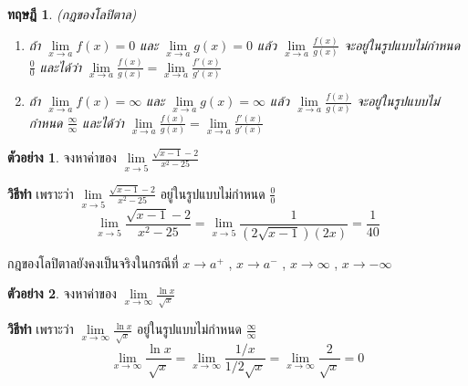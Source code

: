 \documentclass[
]{book}
\newtheorem{theorem}{ทฤษฎี}[chapter]
\theoremstyle{definition}
\theoremstyle{definition}
\newtheorem{example}{ตัวอย่าง}[chapter]
\theoremstyle{definition}
\theoremstyle{definition}
\theoremstyle{remark}
\begin{document}
\begin{theorem}

(กฎของโลปิตาล)\\

\begin{enumerate}
\def\labelenumi{\arabic{enumi}.}
\item
  ถ้า \(\mathop {\lim }\limits_{x\to a} f(x)=0\) และ \(\mathop {\lim
      }\limits_{x\to a} g(x)=0\) แล้ว
  \(\displaystyle \mathop {\lim }\limits_{x\to
      a}
      \frac{f(x)}{g(x)}\) จะอยู่ในรูปแบบไม่กำหนด
  \(\displaystyle \frac{0}{0}\) และได้ว่า
  \(\displaystyle \mathop {\lim }\limits_{x\to a}
      \frac{f(x)}{g(x)}=\mathop {\lim
      }\limits_{x\to a} \frac{{f}'(x)}{{g}'(x)}\)\\
\item
  ถ้า \(\mathop {\lim }\limits_{x\to a} f(x)=\infty\) และ \(\mathop {\lim
      }\limits_{x\to a} g(x)=\infty\) แล้ว \(\displaystyle \mathop {\lim
      }\limits_{x\to a}
      \frac{f(x)}{g(x)}\) จะอยู่ในรูปแบบไม่กำหนด
  \(\displaystyle \frac{\infty
      }{\infty }\) และได้ว่า
  \(\displaystyle \mathop {\lim }\limits_{x\to a}
      \frac{f(x)}{g(x)}=\mathop {\lim
      }\limits_{x\to a} \frac{{f}'(x)}{{g}'(x)}\)
\end{enumerate}

\end{theorem}

\begin{example}
จงหาค่าของ \(\displaystyle \mathop {\lim }\limits_{x\to 5} \frac{\sqrt
{x-1}
-2}{x^2-25}\)
\end{example}

\textbf{วิธีทำ} เพราะว่า
\(\displaystyle \mathop {\lim }\limits_{x\to 5} \frac{\sqrt
{x-1}
-2}{x^2-25}\) อยู่ในรูปแบบไม่กำหนด \(\displaystyle \frac{0}{0}\)
\[\displaystyle \mathop {\lim }\limits_{x\to 5} \frac{\sqrt {x-1} 
-2}{x^2-25}=\mathop {\lim 
}\limits_{x\to 5} \frac{1}{(2\sqrt {x-1} )(2x)}=\frac{1}{40}\]

กฎของโลปิตาลยังคงเป็นจริงในกรณีที่ \(x\to a^+\) , \(x\to a^-\) , \(x\to \infty\) ,
\(x\to -\infty\)

\begin{example}
จงหาค่าของ \(\displaystyle \mathop {\lim }\limits_{x\to \infty } \frac{\ln
x}{\sqrt x }\)
\end{example}

\textbf{วิธีทำ} เพราะว่า
\(\displaystyle \mathop {\lim }\limits_{x\to \infty } \frac{\ln
x}{\sqrt x
}\) อยู่ในรูปแบบไม่กำหนด \(\displaystyle \frac{\infty }{\infty }\)
\[\displaystyle \mathop {\lim }\limits_{x\to \infty } \frac{\ln x}{\sqrt x 
}=\mathop {\lim 
}\limits_{x\to \infty } \frac{1/x}{1/2\sqrt x }=\mathop {\lim }\limits_{x\to 
\infty } \frac{2}{\sqrt x }=0\]
\end{document}
